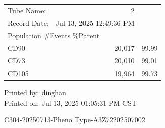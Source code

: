 \documentclass[UTF8,10pt,a4paper,fontset=fandol]{ctexart}
\newcommand{\fieldvalue}[1]{#1}
\begin{document}
\noindent
\begin{tabularx}{0.62\textwidth}{@{}lrr@{}}
Tube Name: &
\fieldvalue{2} & \\

Record Date: &
\fieldvalue{Jul 13, 2025 12:49:36 PM} & \\[0.3em]

\multicolumn{3}{l}{Population \hfill \#Events \hfill \%Parent}\\
CD90 &
\fieldvalue{20,017} &
\fieldvalue{99.99}\\
CD73 &
\fieldvalue{20,010} &
\fieldvalue{99.01}\\
CD105 &
\fieldvalue{19,964} &
\fieldvalue{99.73}
\end{tabularx}

\vfill

\begin{flushright}
Printed by: dinghan\\
Printed on: Jul 13, 2025 01:05:31 PM CST
\end{flushright}

\newpage

\begin{center}
C304-20250713-Pheno Type-A3Z72202507002
\end{center}
\end{document}
